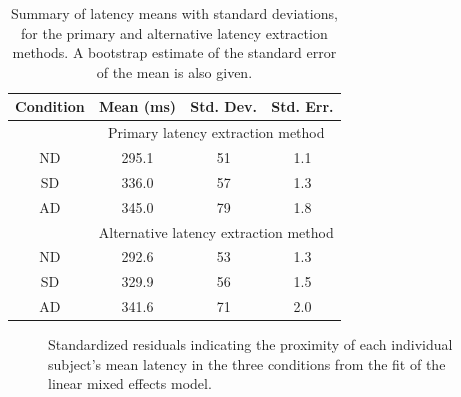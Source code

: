 \documentclass[10pt,letterpaper]{article}
\begin{document}
\begin{table}[ht]
\caption{Summary of latency means with standard deviations, for the
  primary and alternative latency extraction methods. A bootstrap
  estimate of the standard error of the mean is also given.}
\centering
\begin{tabular}{c c c c}
\hline
\textbf{Condition} & \textbf{Mean (ms)} & \textbf{Std. Dev.} & \textbf{Std. Err.} \\ [0.5ex]
\hline
~ & \multicolumn{3}{c}{Primary latency extraction method} \\
\hline
ND & 295.1 & 51 & 1.1 \\
SD & 336.0 & 57 & 1.3 \\
AD & 345.0 & 79 & 1.8 \\ [1ex]
\hline
~ & \multicolumn{3}{c}{Alternative latency extraction method} \\
\hline
ND & 292.6 & 53 & 1.3 \\
SD & 329.9 & 56 & 1.5 \\
AD & 341.6 & 71 & 2.0 \\ [1ex]
\hline
\end{tabular}
\label{table:latmeans}
\end{table}


\begin{figure}[htb!]
\centering
\caption[Linear mixed effects model residuals] {Standardized residuals
  indicating the proximity of each individual subject's mean latency
  in the three conditions from the fit of the linear mixed effects
  model.}
\label{residuals}
\end{figure}
\end{document}
